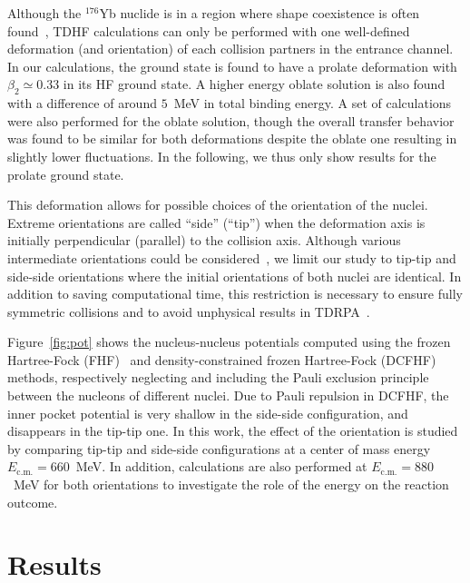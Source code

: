 Although the $^{176}$Yb nuclide is in a region where shape coexistence is often found~\citep{fu2018,nomura2011,robledo2009,sarriguren2008,xu2011}, TDHF calculations can only be performed with one well-defined deformation (and orientation) of each collision partners in the entrance channel. 
In our calculations, the ground state is found to have a prolate deformation with $\beta_2\simeq 0.33$ in its HF ground state.
A higher energy oblate solution is also found with a difference of around $5$~MeV in total binding energy.
A set of calculations were also performed for the oblate solution, though the overall transfer behavior was found to be similar for both deformations despite the oblate one resulting in slightly lower fluctuations.
In the following, we thus only show results for the prolate ground state. 

This deformation allows for possible choices of the orientation of the nuclei. 
Extreme orientations are called ``side'' (``tip'') when the deformation axis is initially perpendicular (parallel) to the collision axis. 
Although various intermediate orientations could be considered~\citep{godbey2019}, we limit our study to tip-tip and side-side orientations where the initial orientations of both nuclei are identical. 
In addition to saving computational time, this restriction is necessary to ensure fully symmetric collisions and to avoid unphysical results in TDRPA~\citep{williams2018}.

Figure~\ref{fig:pot} shows the nucleus-nucleus potentials computed using the frozen Hartree-Fock (FHF)~\citep{simenel2008,washiyama2008} and density-constrained frozen Hartree-Fock (DCFHF)~\citep{simenel2017} methods, 
respectively neglecting and including the Pauli exclusion principle between the nucleons of different nuclei.
Due to Pauli repulsion in DCFHF, the inner pocket potential is very shallow in the side-side configuration, and disappears in the tip-tip one. 
In this work, the effect of the orientation is studied by comparing tip-tip and side-side configurations at a center of mass energy 
$E_\mathrm{c.m.}=660$~MeV. 
In addition, calculations are also performed at $E_\mathrm{c.m.}=880$~MeV for both orientations to investigate the role of the energy on the reaction outcome. 





\section{Results}


